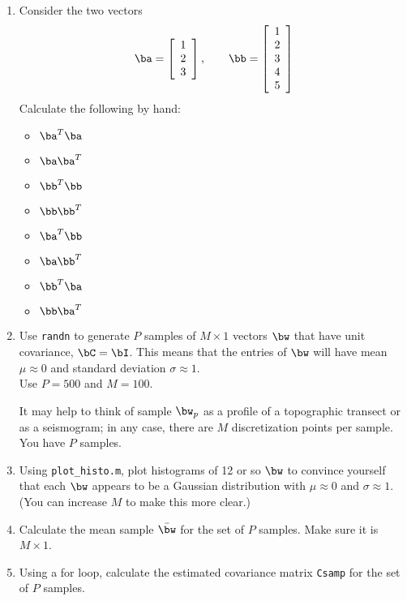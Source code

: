 \documentclass[11pt,titlepage,fleqn]{article}
\begin{document}
\begin{enumerate}
\item Consider the two vectors
%
\begin{equation*}
\ba =  \left[ \begin{array}{r} 1 \\ 2 \\ 3 \end{array} \right],
\quad\quad
\bb =  \left[ \begin{array}{r} 1 \\ 2 \\ 3 \\ 4 \\ 5 \end{array} \right]
\end{equation*}
%
Calculate the following by hand:
%
\begin{itemize}
\item $\ba^T \ba$
\item $\ba \ba^T$
\item $\bb^T \bb$
\item $\bb \bb^T$
\item $\ba^T \bb$
\item $\ba \bb^T$
\item $\bb^T \ba$
\item $\bb \ba^T$
\end{itemize}

\item Use \verb+randn+ to generate $P$ samples of $M \times 1$ vectors $\bw$ that have unit covariance, $\bC = \bI$.
This means that the entries of $\bw$ will have mean $\mu \approx 0$ and standard deviation $\sigma \approx 1$. \\
Use $P = 500$ and $M = 100$.

It may help to think of sample $\bw_p$ as a profile of a topographic transect or as a seismogram; in any case, there are $M$ discretization points per sample. You have $P$ samples.

\item Using \verb+plot_histo.m+, plot histograms of 12 or so $\bw$ to convince yourself that each $\bw$ appears to be a Gaussian distribution with $\mu \approx 0$ and $\sigma \approx 1$. (You can increase $M$ to make this more clear.)

\item Calculate the mean sample $\bar{\bw}$ for the set of $P$ samples. Make sure it is $M \times 1$.

\item Using a for loop, calculate the estimated covariance matrix \verb+Csamp+ for the set of $P$ samples.


\end{enumerate}
\end{document}
